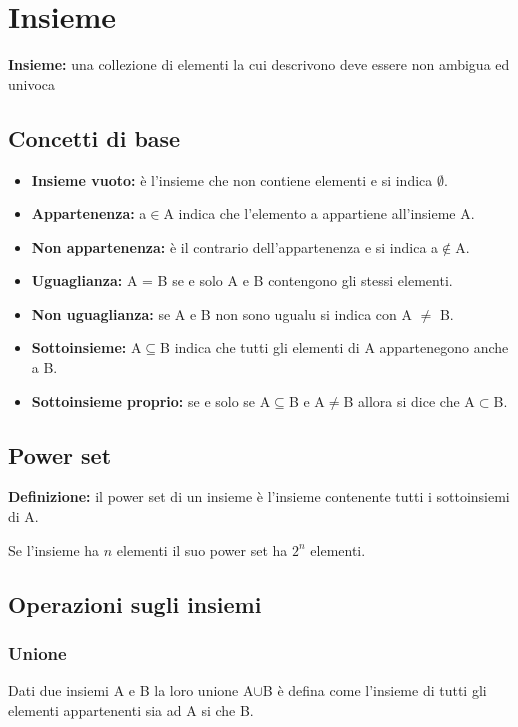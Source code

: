 \documentclass{book}
\begin{document}
    \section{Insieme}
    \textbf{Insieme:} una collezione di elementi la cui descrivono deve essere non ambigua ed univoca

    \subsection{Concetti di base}
    \begin{itemize}
        \item \textbf{Insieme vuoto:} è l'insieme che non contiene elementi e si indica $\emptyset$.
        \item \textbf{Appartenenza:} a$\in$A indica che l'elemento a appartiene all'insieme A.
        \item \textbf{Non appartenenza:} è il contrario dell'appartenenza e si indica a$\notin$A.
        \item \textbf{Uguaglianza:} A = B se e solo A e B contengono gli stessi elementi.
        \item \textbf{Non uguaglianza:} se A e B non sono ugualu si indica con A $\neq$ B.
        \item \textbf{Sottoinsieme:} A$\subseteq$B indica che tutti gli elementi di A appartenegono anche a B.
        \item \textbf{Sottoinsieme proprio:} se e solo se A$\subseteq$B e A$\neq$B allora si dice che A$\subset$B.
    \end{itemize}

    \subsection{Power set}
    \textbf{Definizione:} il power set di un insieme è l'insieme contenente tutti i sottoinsiemi di A.


    Se l'insieme ha $n$ elementi il suo power set ha $2^n$ elementi.

    \subsection{Operazioni sugli insiemi}
    \subsubsection{Unione}
    Dati due insiemi A e B la loro unione A$\cup$B è defina come l'insieme di tutti gli elementi appartenenti sia ad A si che B.
\end{document}
